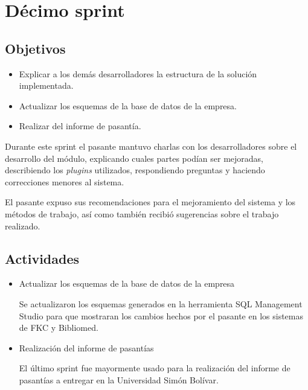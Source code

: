 ﻿\section{Décimo sprint} %
\label{sec:decimo_sprint}

\subsection{Objetivos}

\begin{itemize}
	\item Explicar a los demás desarrolladores la estructura de la solución implementada.
	\item Actualizar los esquemas de la base de datos de la empresa.
	\item Realizar del informe de pasantía.
\end{itemize}

Durante este sprint el pasante mantuvo charlas con los desarrolladores sobre el desarrollo del módulo, explicando cuales partes podían ser mejoradas, describiendo los \emph{plugins} utilizados, respondiendo preguntas y haciendo correcciones menores al sistema. 

El pasante expuso sus recomendaciones para el mejoramiento del sistema y los métodos de trabajo, así como también recibió sugerencias sobre el trabajo realizado.

\subsection{Actividades} %
\label{sub:actividades10}

\begin{itemize}

\item Actualizar los esquemas de la base de datos de la empresa

Se actualizaron los esquemas generados en la herramienta SQL Management Studio para que mostraran los cambios hechos por el pasante en los sistemas de FKC y Bibliomed.

\item Realización del informe de pasantías

El último sprint fue mayormente usado para la realización del informe de pasantías a entregar en la Universidad Simón Bolívar.

\end{itemize}


